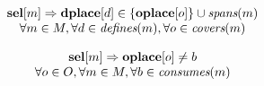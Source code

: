 \begin{equation}
  \begin{array}{c}
    \mVar{sel}[m]
    \mImp
    \mVar{dplace}[d] \in \mSet{\mVar{oplace}[o]} \cup \mSpans(m) \\
    \forall m \in \mMatchSet,
    \forall d \in \mDefines(m),
    \forall o \in \mCovers(m)
  \end{array}
  \labelEquation{spanning}
\end{equation}

\begin{equation}
  \begin{array}{c}
    \mVar{sel}[m]
    \mImp
    \mVar{oplace}[o] \neq b \\
    \forall o \in \mOpSet,
    \forall m \in \mMatchSet,
    \forall b \in \mConsumes(m)
  \end{array}
  \labelEquation{consumption}
\end{equation}
